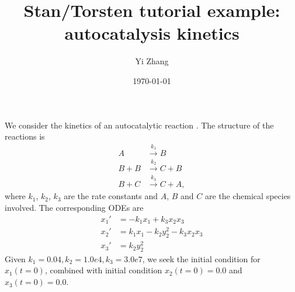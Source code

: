 \documentclass[11pt]{article}
\author{Yi Zhang}
\date{\today}
\title{Stan/Torsten tutorial example: autocatalysis kinetics}
\begin{document}
\maketitle
We consider the kinetics of an autocatalytic reaction \cite{robertson_numerical_1966}. The
structure of the reactions is 
\begin{align*}
A &\xrightarrow{k_1} B\\
B+B &\xrightarrow{k_2} C + B\\
B+C&\xrightarrow{k_3} C + A,
\end{align*}
where \(k_1\), \(k_2\), \(k_3\) are the rate
constants and \(A\), \(B\) and \(C\) are the chemical species
involved. The corresponding ODEs are
\begin{align*}
x_1' &= -k_1x_1 + k_3x_2x_3\\
x_2' &=  k_1x_1 - k_2y_2^2 - k_3x_2x_3\\
x_3' &=  k_2y_2^2
\end{align*}
Given \(k_1=0.04, k_2=1.0e4, k_3=3.0e7\), we seek the
initial condition for \(x_1(t=0)\), combined with initial
condition \(x_2(t=0)=0.0\) and \(x_3(t=0)=0.0\).



\end{document}
